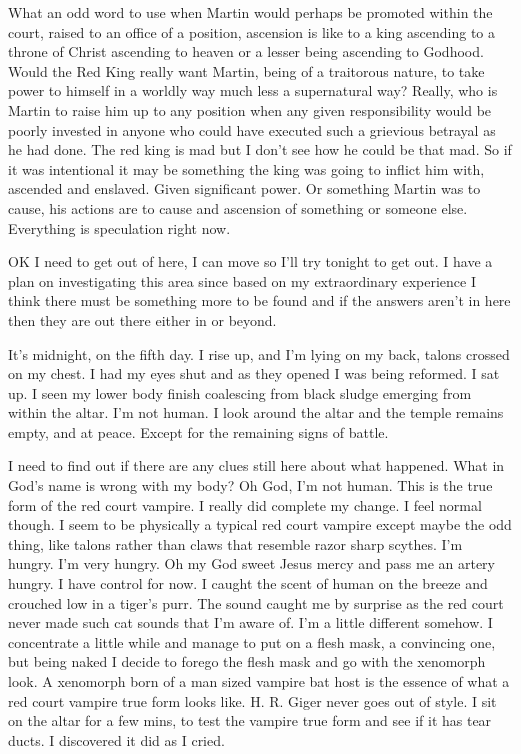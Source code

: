 What an odd word to use when Martin would perhaps be promoted within the court, raised to an office of a position, ascension is like to a king ascending to a throne of Christ ascending to heaven or a lesser being ascending to Godhood. Would the Red King really want Martin, being of a traitorous nature, to take power to himself in a worldly way much less a supernatural way? Really, who is Martin to raise him up to any position when any given responsibility would be poorly invested in anyone who could have executed such a grievious betrayal as he had done. The red king is mad but I don't see how he could be that mad. So if it was intentional it may be something the king was going to inflict him with, ascended and enslaved. Given significant power. Or something Martin was to cause, his actions are to cause and ascension of something or someone else. Everything is speculation right now.

OK I need to get out of here, I can move so I'll try tonight to get out. I have a plan on investigating this area since based on my extraordinary experience I think there must be something more to be found and if the answers aren't in here then they are out there either in \chichenitza or beyond.

It's midnight, on the fifth day. I rise up, and I'm lying on my back, talons crossed on my chest. I had my eyes shut and as they opened I was being reformed. I sat up. I seen my lower body finish coalescing from black sludge emerging from within the altar. I'm not human. I look around the altar and the temple remains empty, and at peace. Except for the remaining signs of battle.

\parasep

I need to find out if there are any clues still here about what happened. What in God's name is wrong with my body? Oh God, I'm not human. This is the true form of the red court vampire. I really did complete my change. I feel normal though. I seem to be physically a typical red court vampire except maybe the odd thing, like talons rather than claws that resemble razor sharp scythes. I'm hungry. I'm very hungry. Oh my God sweet Jesus mercy and pass me an artery hungry. I have control for now. I caught the scent of human on the breeze and crouched low in a tiger's purr. The sound caught me by surprise as the red court never made such cat sounds that I'm aware of. I'm a little different somehow. I concentrate a little while and manage to put on a flesh mask, a convincing one, but being naked I decide to forego the flesh mask and go with the xenomorph look. A xenomorph born of a man sized vampire bat host is the essence of what a red court vampire true form looks like. H. R. Giger never goes out of style. I sit on the altar for a few mins, to test the vampire true form and see if it has tear ducts. I discovered it did as I cried.

